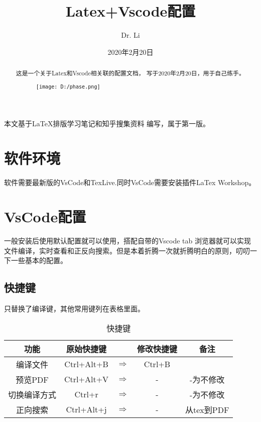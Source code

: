 \documentclass[10pt, UTF8]{ctexart}%
\begin{document}
    
    \title{Latex+Vscode配置}
    \author{Dr. Li}
    \date{2020年2月20日}
    \maketitle

    \begin{abstract}
        这是一个关于Latex和Vscode相关联的配置文档，
        写于2020年2月20日，用于自己练手。
        \begin{figure}[htbp]%
            \centering
            \texttt{[image: D:/phase.png]}
        \end{figure} 
    \end{abstract}

   本文基于\LaTeX 排版学习笔记\cite{LaTex排版学习笔记}和知乎搜集资料
   \cite{知乎Ref1,知乎Ref2}编写，属于第一版。
    \newpage
    \section{软件环境}
    软件需要最新版的VsCode\cite{Vscode网址}和TexLive\cite{TexLive网址}.同时VsCode需要安装插件LaTex Workshop。
    \section{VsCode配置}
    一般安装后使用默认配置就可以使用，搭配自带的Vscode tab 浏览器就可以实现文件编译，实时查看和正反向搜索。但是本着折腾一次就折腾明白的原则，叨叨一下一些基本的配置。
    \subsection{快捷键}
        只替换了编译键，其他常用键列在表格里面。
        \begin{table}[htbp]
            \centering
            \caption{快捷键}
            \begin{tabular}{|c|ccc|c|}
            
                \hline
                功能 & 原始快捷键 & \, & 修改快捷键 &备注\\
                \hline
                编译文件 & Ctrl+Alt+B & $\Rightarrow$ & Ctrl+B & \\
                \hline
                预览PDF & Ctrl+Alt+V & $\Rightarrow$ & - & -为不修改\\
                \hline
                切换编译方式 & Ctrl+r & $\Rightarrow$ & - & -为不修改\\
                \hline
                正向搜索 & Ctrl+Alt+j & $\Rightarrow$ & - & 从tex到PDF\\
                \hline        

            \end{tabular}
        \end{table}
\end{document}
